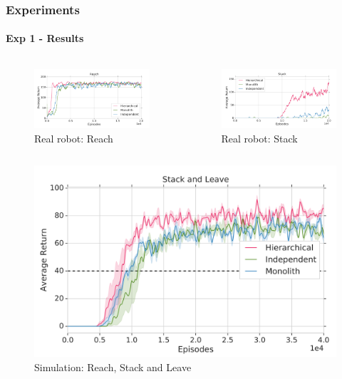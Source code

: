\documentclass{beamer}
\begin{document}
\begin{frame}
	\frametitle{Experiments}
	\framesubtitle{Exp 1 - Results}
	
	\begin{columns}[c]
		\begin{figure}[h!]
			\caption{Real robot: Reach}
			\includegraphics[scale=0.12]{exp-r1-1.png}
		\end{figure}
		
		\begin{figure}[h!]
			\caption{Real robot: Stack}
			\includegraphics[scale=0.12]{exp-r1-2.png}
		\end{figure}
	\end{columns}
	
	\begin{figure}[h!]
		\caption{Simulation: Reach, Stack and Leave}
		\includegraphics[scale=0.12]{sim-r1.png}
	\end{figure}
\end{frame}
\end{document}
